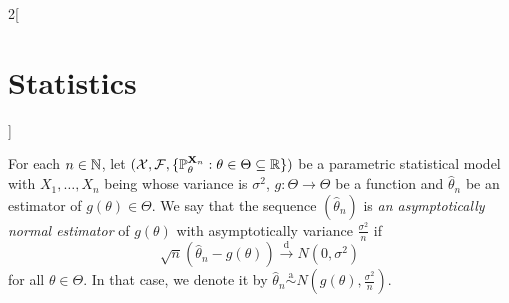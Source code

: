 \documentclass[../../../main.tex]{subfiles}
\begin{document}
\begin{multicols}{2}[\section{Statistics}]
\begin{definition}
  \end{definition}
  \begin{definition}
    For each $n\in\mathbb{N}$, let $(\mathcal{X},\mathcal{F},\{\mathbb{P}_{\theta}^{\boldsymbol{\mathrm{X}}_n}:\theta\in\Theta\subseteq \mathbb{R}\})$ be a parametric statistical model with $X_1,\ldots,X_n$ being \iid whose variance is $\sigma^2$, $g:\Theta\rightarrow\Theta$ be a function and ${{\hat\theta}}_n$ be an estimator of $g(\theta)\in\Theta$. We say that the sequence $({\hat\theta}_n)$ is \emph{an asymptotically normal estimator} of $g(\theta)$ with asymptotically variance $\frac{\sigma^2}{n}$ if $$\sqrt{n}({\hat\theta}_n-g(\theta))\overset{\text{d}}{\longrightarrow}N(0,\sigma^2)$$
    for all $\theta\in\Theta$. In that case, we denote it by ${\hat\theta}_n\overset{\text{a}}{\sim}N\left(g(\theta),\frac{\sigma^2}{n}\right)$.
  \end{definition}

\end{multicols}
\end{document}
